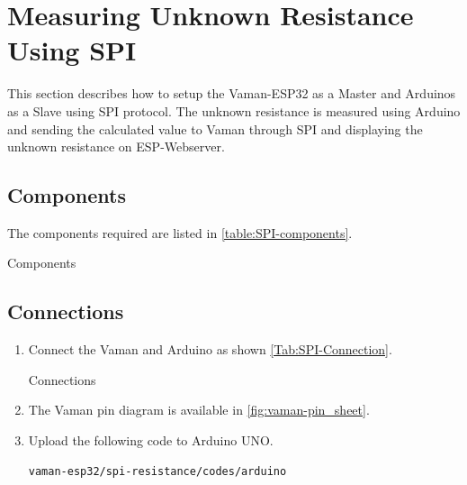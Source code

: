 \section{Measuring Unknown Resistance Using SPI}
This section describes how to setup the Vaman-ESP32 as a Master and Arduinos as
a Slave using SPI protocol. The unknown resistance is measured using Arduino and
sending the calculated value to Vaman through SPI and displaying the unknown
resistance on ESP-Webserver.
\subsection{Components}
The components required are listed in \autoref{table:SPI-components}.
\begin{table}[!ht]
\centering

\caption{Components}
\label{table:SPI-components}
\end{table}

\subsection{Connections}
\begin{enumerate}
\item
Connect the Vaman and Arduino as shown \autoref{Tab:SPI-Connection}.

\begin{table}[!ht]
\centering

\caption{Connections}
\label{Tab:SPI-Connection}
\end{table}
\item
The Vaman pin diagram is available in \autoref{fig:vaman-pin_sheet}.

\item Upload the following code to Arduino UNO.
\begin{lstlisting}
vaman-esp32/spi-resistance/codes/arduino
\end{lstlisting}
\end{enumerate}
